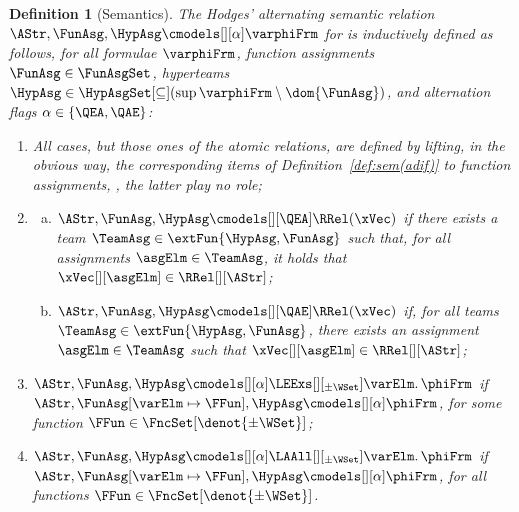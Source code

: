 \documentclass[authoryear]{elsarticle}
\newtheorem{definition}{Definition}
\begin{document}
\begin{definition}[\Meta Semantics]
  \label{def:sem(met)}
  The \emph{Hodges' alternating semantic relation} $\AStr, \FunAsg, \HypAsg
  \cmodels[][\alpha] \varphiFrm$ for \Meta is inductively defined as follows,
  for all \Meta formulae $\varphiFrm$, function assignments $\FunAsg \in
  \FunAsgSet$, hyperteams $\HypAsg \in \HypAsgSet[\subseteq](\sup{\varphiFrm}
  \setminus \dom{\FunAsg})$, and alternation flags $\alpha \in \{ \QEA, \QAE
  \}$:
  \begin{enumerate}[1)]
  \item[\ref*{def:sem(adif:fbv)},\ref*{def:sem(adif:tbv)},%
    \ref*{def:sem(adif:neg)}-\ref*{def:sem(adif:all)})]\label{def:sem(met:adif)}
    All \ADIF cases, but those ones of the atomic relations, are defined by
    lifting, in the obvious way, the corresponding items of
    Definition~\ref{def:sem(adif)} to function assignments, \ie, the latter play
    no role;
  \setcounter{enumi}{2}
  \item\label{def:sem(met:rel)}
    \begin{enumerate}[a)]
    \item\label{def:sem(met:rel:ea)}
      $\AStr, \FunAsg, \HypAsg \cmodels[][\QEA] \RRel(\xVec)$ if there exists a
      team $\TeamAsg \in \extFun{\HypAsg, \FunAsg}$ such that, for all
      assignments $\asgElm \in \TeamAsg$, it holds that $\xVec[][\asgElm] \in
      \RRel[][\AStr]$;
    \item\label{def:sem(met:rel:ae)}
      $\AStr, \FunAsg, \HypAsg \cmodels[][\QAE] \RRel(\xVec)$ if, for all teams
      $\TeamAsg \in \extFun{\HypAsg, \FunAsg}$, there exists an assignment
      $\asgElm \in \TeamAsg$ such that $\xVec[][\asgElm] \in \RRel[][\AStr]$;
    \end{enumerate}
  \setcounter{enumi}{8}
  \item\label{def:sem(met:eexs)}
    $\AStr, \FunAsg, \HypAsg \cmodels[][\alpha] \LEExs[][_{\pm\WSet}] \varElm
    \ldotp \phiFrm$ if $\AStr, {\FunAsg}[\varElm \mapsto \FFun], \HypAsg
    \cmodels[][\alpha] \phiFrm$, for some function $\FFun \in
    \FncSet[\denot{\pm\WSet}]{}$;
  \item\label{def:sem(met:aall)}
    $\AStr, \FunAsg, \HypAsg \cmodels[][\alpha] \LAAll[][_{\pm\WSet}] \varElm
    \ldotp \phiFrm$ if $\AStr, {\FunAsg}[\varElm \mapsto \FFun], \HypAsg
    \cmodels[][\alpha] \phiFrm$, for all functions $\FFun \in
    \FncSet[\denot{\pm\WSet}]{}$.
  \end{enumerate}
\end{definition}
\end{document}
